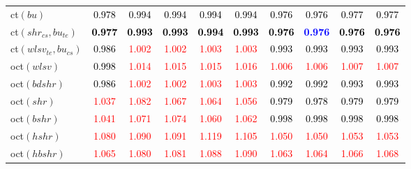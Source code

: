 \begin{tabular}[t]{>{\centering\arraybackslash}m{2.5cm}ccccccccc}
ct$(bu)$ & \textcolor{black}{0.978} & \textcolor{black}{0.994} & \textcolor{black}{0.994} & \textcolor{black}{0.994} & \textcolor{black}{0.994} & \textcolor{black}{0.976} & \textcolor{black}{0.976} & \textcolor{black}{0.977} & \textcolor{black}{0.977}\\
ct$(shr_{cs}, bu_{te})$ & \textcolor{black}{\textbf{0.977}} & \textcolor{black}{\textbf{0.993}} & \textcolor{black}{\textbf{0.993}} & \textcolor{black}{\textbf{0.994}} & \textcolor{black}{\textbf{0.993}} & \textcolor{black}{\textbf{0.976}} & \textcolor{blue}{\textbf{0.976}} & \textcolor{black}{\textbf{0.976}} & \textcolor{black}{\textbf{0.976}}\\
ct$(wlsv_{te}, bu_{cs})$ & \textcolor{black}{0.986} & \textcolor{red}{1.002} & \textcolor{red}{1.002} & \textcolor{red}{1.003} & \textcolor{red}{1.003} & \textcolor{black}{0.993} & \textcolor{black}{0.993} & \textcolor{black}{0.993} & \textcolor{black}{0.993}\\
oct$(wlsv)$ & \textcolor{black}{0.998} & \textcolor{red}{1.014} & \textcolor{red}{1.015} & \textcolor{red}{1.015} & \textcolor{red}{1.016} & \textcolor{red}{1.006} & \textcolor{red}{1.006} & \textcolor{red}{1.007} & \textcolor{red}{1.007}\\
oct$(bdshr)$ & \textcolor{black}{0.986} & \textcolor{red}{1.002} & \textcolor{red}{1.002} & \textcolor{red}{1.003} & \textcolor{red}{1.003} & \textcolor{black}{0.992} & \textcolor{black}{0.992} & \textcolor{black}{0.993} & \textcolor{black}{0.993}\\
oct$(shr)$ & \textcolor{red}{1.037} & \textcolor{red}{1.082} & \textcolor{red}{1.067} & \textcolor{red}{1.064} & \textcolor{red}{1.056} & \textcolor{black}{0.979} & \textcolor{black}{0.978} & \textcolor{black}{0.979} & \textcolor{black}{0.979}\\
oct$(bshr)$ & \textcolor{red}{1.041} & \textcolor{red}{1.071} & \textcolor{red}{1.074} & \textcolor{red}{1.060} & \textcolor{red}{1.062} & \textcolor{black}{0.998} & \textcolor{black}{0.998} & \textcolor{black}{0.998} & \textcolor{black}{0.998}\\
oct$(hshr)$ & \textcolor{red}{1.080} & \textcolor{red}{1.090} & \textcolor{red}{1.091} & \textcolor{red}{1.119} & \textcolor{red}{1.105} & \textcolor{red}{1.050} & \textcolor{red}{1.050} & \textcolor{red}{1.053} & \textcolor{red}{1.053}\\
oct$(hbshr)$ & \textcolor{red}{1.065} & \textcolor{red}{1.080} & \textcolor{red}{1.081} & \textcolor{red}{1.088} & \textcolor{red}{1.090} & \textcolor{red}{1.063} & \textcolor{red}{1.064} & \textcolor{red}{1.066} & \textcolor{red}{1.068}\\

\end{tabular}
